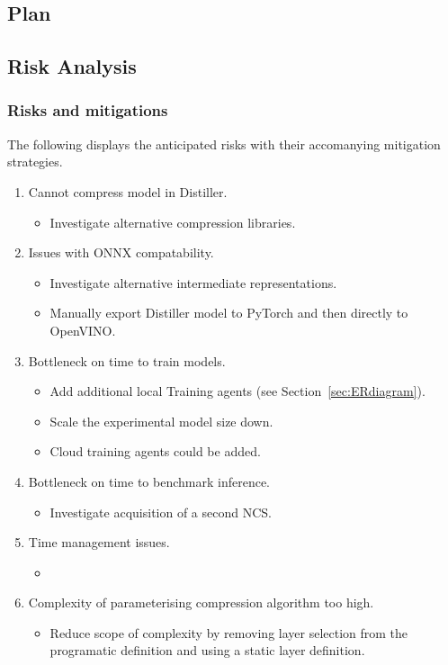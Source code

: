 \documentclass[../../D1.tex]{subfiles}
\begin{document}
\subsection{Plan}

\subsection{Risk Analysis}
\subsubsection{Risks and mitigations}
The following displays the anticipated risks with their accomanying mitigation strategies.
\begin{enumerate}
    \item Cannot compress model in Distiller.
    \begin{itemize}
        \item Investigate alternative compression libraries.
    \end{itemize}

    \item Issues with ONNX compatability.
    \begin{itemize}
        \item Investigate alternative intermediate representations.
        \item Manually export Distiller model to PyTorch and then directly to OpenVINO.
    \end{itemize}

    \item Bottleneck on time to train models.
    \begin{itemize}
        \item Add additional local Training agents (see Section~\ref{sec:ERdiagram}).
        \item Scale the experimental model size down.
        \item Cloud training agents could be added.
    \end{itemize}

    \item Bottleneck on time to benchmark inference.
    \begin{itemize}
        \item Investigate acquisition of a second NCS.
    \end{itemize}

    \item Time management issues.
    \begin{itemize}
        \item 
    \end{itemize}

    \item Complexity of parameterising compression algorithm too high.
    \begin{itemize}
        \item Reduce scope of complexity by removing layer selection from the programatic definition and using a static layer definition.
    \end{itemize}
\end{enumerate}
\end{document}
